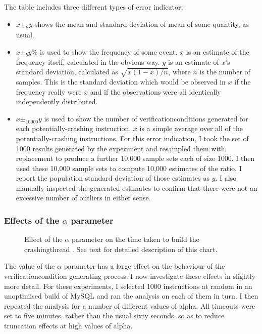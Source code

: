 The table includes three different types of error indicator:

\begin{itemize}
\item $x \pm_\mu y$ shows the mean and standard deviation of mean of
  some quantity, as usual.
\item $x \pm_b y$\% is used to show the frequency of some event.  $x$
  is an estimate of the frequency itself, calculated in the obvious
  way.  $y$ is an estimate of $x$'s standard deviation, calculated as
  $\sqrt{x(1-x)/n}$, where $n$ is the number of samples.  This is
  the standard deviation which would be observed in $x$ if the
  frequency really were $x$ and if the observations were all
  identically independently distributed.
\item $x \pm_{10000} y$ is used to show the number of
  \glspl{verificationcondition} generated for each
  potentially-crashing instruction.  $x$ is a simple average over all
  of the potentially-crashing instructions.  For this error
  indication, I took the set of 1000 results generated by the
  experiment and resampled them with replacement to produce a further
  10,000 sample sets each of size 1000.  I then used these 10,000
  sample sets to compute 10,000 estimates of the ratio.  I report the
  population standard deviation of those estimates as $y$.  I also
  manually inspected the generated estimates to confirm that there
  were not an excessive number of outliers in either sense.
\end{itemize}

\subsubsection{Effects of the $\alpha$ parameter}
\label{sect:eval:alpha}


\begin{figure}
  \centerline{}
  \caption{Effect of the $\alpha$ parameter on the time taken to build
    the \gls{crashingthread} {\StateMachines}.  See text for detailed
    description of this chart.}
  \label{fig:perf:alpha:bpm:unopt}
\end{figure}

The value of the $\alpha$ parameter has a large effect on the
behaviour of the \gls{verificationcondition} generating process.  I
now investigate these effects in slightly more detail.  For these
experiments, I selected 1000 instructions at random in an unoptimised
build of MySQL and ran the analysis on each of them in turn.  I then
repeated the analysis for a number of different values of \gls{alpha}.
All timeouts were set to five minutes, rather than the usual sixty
seconds, so as to reduce truncation effects at high values of
\gls{alpha}.

